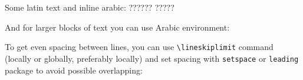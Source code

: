 Some latin text and inline arabic: \textarabic{?????? ?????}
 
And for larger blocks of text you can use Arabic environment:
 
 
To get even spacing between lines, you can use \verb|\lineskiplimit| command (locally or globally, preferably locally) and set spacing with \verb|setspace| or \verb|leading| package to avoid possible overlapping: